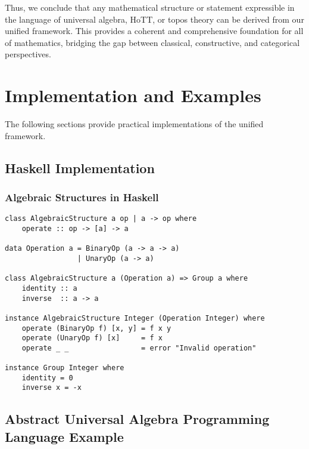 \documentclass{article}
\begin{document}
Thus, we conclude that any mathematical structure or statement expressible in the language of universal algebra, HoTT, or topos theory can be derived from our unified framework. This provides a coherent and comprehensive foundation for all of mathematics, bridging the gap between classical, constructive, and categorical perspectives.


\section{Implementation and Examples}

The following sections provide practical implementations of the unified framework.

\subsection{Haskell Implementation}


\subsubsection{Algebraic Structures in Haskell}

\begin{lstlisting}
class AlgebraicStructure a op | a -> op where
    operate :: op -> [a] -> a

data Operation a = BinaryOp (a -> a -> a)
                 | UnaryOp (a -> a)

class AlgebraicStructure a (Operation a) => Group a where
    identity :: a
    inverse  :: a -> a

instance AlgebraicStructure Integer (Operation Integer) where
    operate (BinaryOp f) [x, y] = f x y
    operate (UnaryOp f) [x]     = f x
    operate _ _                 = error "Invalid operation"

instance Group Integer where
    identity = 0
    inverse x = -x
\end{lstlisting}

\subsection{Abstract Universal Algebra Programming Language Example}

\end{document}
